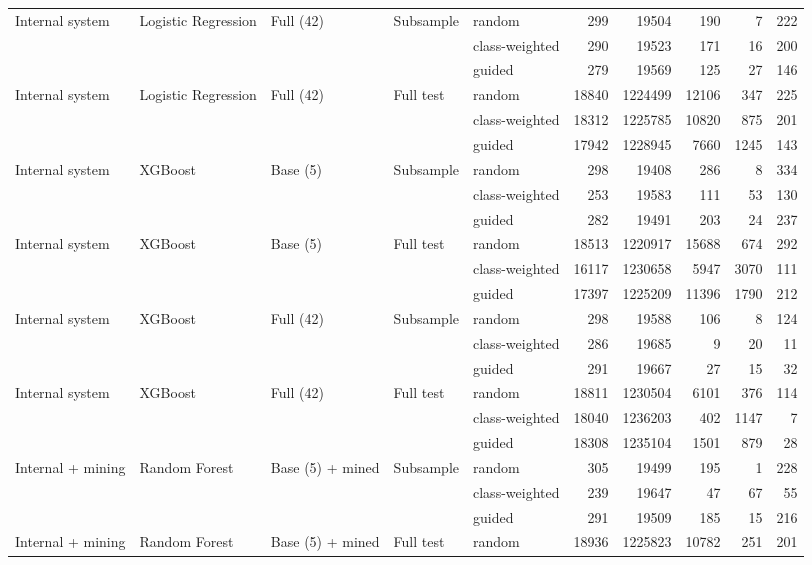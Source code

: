 \begin{longtable}{lllllrrrrr}
\addlinespace
Internal system & Logistic Regression & Full (42) & Subsample & random & 299 & 19504 & 190 & 7 & 222 \\
 &  &  &  & class-weighted & 290 & 19523 & 171 & 16 & 200 \\
 &  &  &  & guided & 279 & 19569 & 125 & 27 & 146 \\
\addlinespace
Internal system & Logistic Regression & Full (42) & Full test & random & 18840 & 1224499 & 12106 & 347 & 225 \\
 &  &  &  & class-weighted & 18312 & 1225785 & 10820 & 875 & 201 \\
 &  &  &  & guided & 17942 & 1228945 & 7660 & 1245 & 143 \\
\addlinespace
Internal system & XGBoost & Base (5) & Subsample & random & 298 & 19408 & 286 & 8 & 334 \\
 &  &  &  & class-weighted & 253 & 19583 & 111 & 53 & 130 \\
 &  &  &  & guided & 282 & 19491 & 203 & 24 & 237 \\
\addlinespace
Internal system & XGBoost & Base (5) & Full test & random & 18513 & 1220917 & 15688 & 674 & 292 \\
 &  &  &  & class-weighted & 16117 & 1230658 & 5947 & 3070 & 111 \\
 &  &  &  & guided & 17397 & 1225209 & 11396 & 1790 & 212 \\
\addlinespace
Internal system & XGBoost & Full (42) & Subsample & random & 298 & 19588 & 106 & 8 & 124 \\
 &  &  &  & class-weighted & 286 & 19685 & 9 & 20 & 11 \\
 &  &  &  & guided & 291 & 19667 & 27 & 15 & 32 \\
\addlinespace
Internal system & XGBoost & Full (42) & Full test & random & 18811 & 1230504 & 6101 & 376 & 114 \\
 &  &  &  & class-weighted & 18040 & 1236203 & 402 & 1147 & 7 \\
 &  &  &  & guided & 18308 & 1235104 & 1501 & 879 & 28 \\
\midrule
Internal + mining & Random Forest & Base (5) + mined & Subsample & random & 305 & 19499 & 195 & 1 & 228 \\
 &  &  &  & class-weighted & 239 & 19647 & 47 & 67 & 55 \\
 &  &  &  & guided & 291 & 19509 & 185 & 15 & 216 \\
\addlinespace
Internal + mining & Random Forest & Base (5) + mined & Full test & random & 18936 & 1225823 & 10782 & 251 & 201 \\

\end{longtable}
